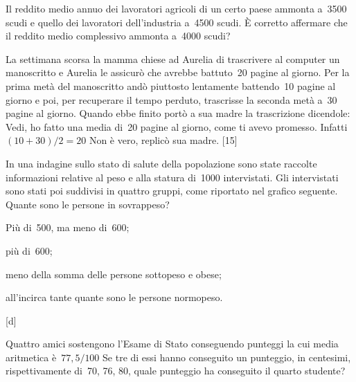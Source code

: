 \begin{esercizio}
\label{ese:A.48}
Il reddito medio annuo dei lavoratori agricoli di un certo paese ammonta 
a~3500 scudi e quello dei lavoratori dell'industria
a~4500 scudi. È corretto affermare che il reddito medio complessivo ammonta 
a~4000 scudi?
\end{esercizio}

\begin{esercizio}
\label{ese:A.49}
La settimana scorsa la mamma chiese ad Aurelia di trascrivere al computer 
un manoscritto e Aurelia le assicurò che avrebbe
battuto~20 pagine al giorno. Per la prima metà del manoscritto andò 
piuttosto lentamente battendo~10 pagine al giorno e poi,
per recuperare il tempo perduto, trascrisse la seconda metà a~30 pagine al 
giorno.
Quando ebbe finito portò a sua madre la trascrizione dicendole: Vedi, ho 
fatto una media di~20 pagine al giorno,
come ti avevo promesso. Infatti~\((10+30)/2=20\) Non è vero, replicò sua 
madre.
\hfill [15]
\end{esercizio}

\begin{multicols}{2}
\begin{esercizio}
\label{ese:A.50}
In una indagine sullo stato di salute della popolazione sono state raccolte 
informazioni relative al peso e
alla statura di~1000 intervistati. Gli intervistati sono stati poi 
suddivisi in quattro gruppi,
come riportato nel grafico seguente. Quante sono le persone in sovrappeso?

\begin{enumeratea}
 \item Più di~500, ma meno di~600;
 \item più di~600;
 \item meno della somma delle persone sottopeso e obese;
 \item all'incirca tante quante sono le persone normopeso.
\end{enumeratea}
\begin{center}
 
\end{center}
\hfill [d]
\end{esercizio}
\end{multicols}

\begin{esercizio}
\label{ese:A.51}
Quattro amici sostengono l'Esame di Stato conseguendo punteggi la cui media 
aritmetica è~\(77,5/100\)
Se tre di essi hanno conseguito un punteggio, in centesimi, rispettivamente 
di~70, 76, 80, quale punteggio ha conseguito il quarto studente?
\end{esercizio}

